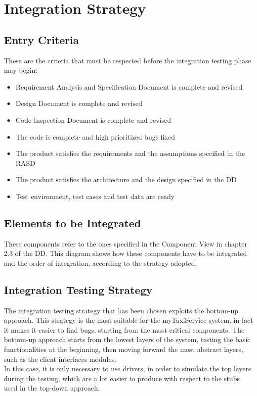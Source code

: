 \documentclass[18pt,oneside,a4paper, titlepage]{article}
\begin{document}
\newpage
\section{Integration Strategy}
	\subsection{Entry Criteria}	
		These are the criteria that must be respected before the integration testing phase may begin:
		\begin{itemize}
			\item Requirement Analysis and Specification Document is complete and revised
			\item Design Document is complete and revised
			\item Code Inspection Document is complete and revised
			\item The code is complete and high prioritized bugs fixed
			\item The product satisfies the requirements and the assumptions specified in the RASD
			\item The product satisfies the architecture and the design specified in the DD
			\item Test environment, test cases and test data are ready
		\end{itemize}	
	\subsection{Elements to	be Integrated}
		These components refer to the ones specified in the Component View in chapter 2.3 of the DD. This diagram shows how these components have to be integrated and the order of integration, according to the strategy adopted.
	\subsection{Integration Testing Strategy}
		The integration testing strategy that has been chosen exploits the bottom-up approach. This strategy is the most suitable for the myTaxiService system, in fact it makes it easier to find bugs, starting from the most critical components. The bottom-up approach starts from the lowest layers of the system, testing the basic functionalities at the beginning, then moving forward the most abstract layers, such as the client interfaces modules.\\ In this case, it is only necessary to use drivers, in order to simulate the top layers during the testing, which are a lot easier to produce with respect to the stubs used in the top-down approach.
	\newpage
\end{document}
